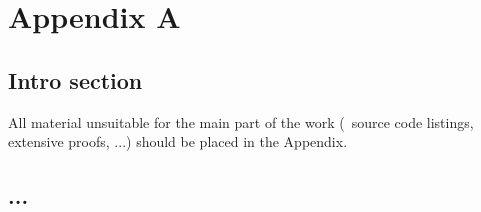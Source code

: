 \graphicspath{{img/}}









\appendix
\chapter{Appendix A}
\label{chap:a}


\section{Intro section}
All material unsuitable for the main part of the work (\eg~source code listings, extensive proofs, ...) should be placed in the Appendix.


\section{...}
